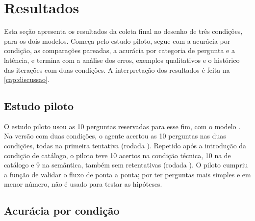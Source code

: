 \chapter{Resultados}
\label{cap:resultados}

Esta seção apresenta os resultados da coleta final no desenho de três
condições, para os dois modelos. Começa pelo estudo piloto, segue com a
acurácia por condição, as comparações pareadas, a acurácia por categoria
de pergunta e a latência, e termina com a análise dos erros, exemplos
qualitativos e o histórico das iterações com duas condições. A
interpretação dos resultados é feita na \autoref{cap:discussao}.

\section{Estudo piloto}
\label{sec:piloto}

O estudo piloto usou as 10 perguntas reservadas para esse fim, com o modelo
. Na versão com duas condições, o agente acertou
as 10 perguntas nas duas condições, todas na primeira tentativa (rodada
). Repetido após a introdução da condição de catálogo, o
piloto teve 10 acertos na condição técnica, 10 na de catálogo e 9 na
semântica, também sem retentativas (rodada ). O piloto
cumpriu a função de validar o fluxo de ponta a ponta; por ter perguntas
mais simples e em menor número, não é usado para testar as hipóteses.

\section{Acurácia por condição}
\label{sec:acuracia}

